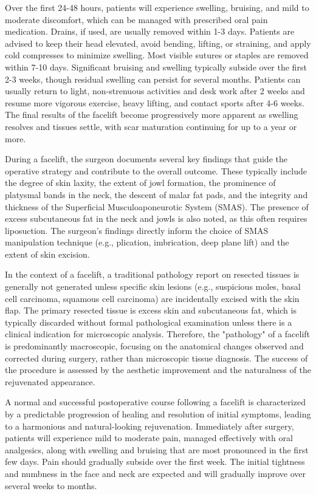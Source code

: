 Over the first 24-48 hours, patients will experience swelling, bruising, and mild to moderate discomfort, which can be managed with prescribed oral pain medication. Drains, if used, are usually removed within 1-3 days. Patients are advised to keep their head elevated, avoid bending, lifting, or straining, and apply cold compresses to minimize swelling. Most visible sutures or staples are removed within 7-10 days. Significant bruising and swelling typically subside over the first 2-3 weeks, though residual swelling can persist for several months. Patients can usually return to light, non-strenuous activities and desk work after 2 weeks and resume more vigorous exercise, heavy lifting, and contact sports after 4-6 weeks. The final results of the facelift become progressively more apparent as swelling resolves and tissues settle, with scar maturation continuing for up to a year or more.

During a facelift, the surgeon documents several key findings that guide the operative strategy and contribute to the overall outcome. These typically include the degree of skin laxity, the extent of jowl formation, the prominence of platysmal bands in the neck, the descent of malar fat pads, and the integrity and thickness of the Superficial Musculoaponeurotic System (SMAS). The presence of excess subcutaneous fat in the neck and jowls is also noted, as this often requires liposuction. The surgeon's findings directly inform the choice of SMAS manipulation technique (e.g., plication, imbrication, deep plane lift) and the extent of skin excision.

In the context of a facelift, a traditional pathology report on resected tissues is generally not generated unless specific skin lesions (e.g., suspicious moles, basal cell carcinoma, squamous cell carcinoma) are incidentally excised with the skin flap. The primary resected tissue is excess skin and subcutaneous fat, which is typically discarded without formal pathological examination unless there is a clinical indication for microscopic analysis. Therefore, the "pathology" of a facelift is predominantly macroscopic, focusing on the anatomical changes observed and corrected during surgery, rather than microscopic tissue diagnosis. The success of the procedure is assessed by the aesthetic improvement and the naturalness of the rejuvenated appearance.

A normal and successful postoperative course following a facelift is characterized by a predictable progression of healing and resolution of initial symptoms, leading to a harmonious and natural-looking rejuvenation. Immediately after surgery, patients will experience mild to moderate pain, managed effectively with oral analgesics, along with swelling and bruising that are most pronounced in the first few days. Pain should gradually subside over the first week. The initial tightness and numbness in the face and neck are expected and will gradually improve over several weeks to months.


